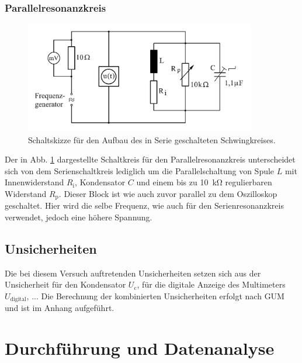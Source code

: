 
		\subsubsection{Parallelresonanzkreis}
			
			\begin{figure}[ht]
				\centering
				\includegraphics[width=0.9\textwidth]{auswertung/Parallelresonanz.PNG}
				\caption{Schaltskizze für den Aufbau des in Serie geschalteten Schwingkreises.}
				\label{fig:ParallelResonanzSkizze}	
			\end{figure}
			
			Der in Abb. \ref{fig:ParallelResonanzSkizze} dargestellte Schaltkreis für den Parallelresonanzkreis unterscheidet sich von dem Serienschaltkreis lediglich um die Parallelschaltung von Spule $L$ mit Innenwiderstand $R_\text{i}$, Kondensator $C$ und einem bis zu \SI{10}{\kilo\ohm} regulierbaren Widerstand $R_\text{p}$. 
			Dieser Block ist wie auch zuvor parallel zu dem Oszilloskop geschaltet.
			Hier wird die selbe Frequenz, wie auch für den Serienresonanzkreis verwendet, jedoch eine höhere Spannung.

	\subsection{Unsicherheiten} 

		Die bei diesem Versuch auftretenden Unsicherheiten setzen sich aus der Unsicherheit für den Kondensator $U_\text{c}$, für die digitale Anzeige des Multimeters $U_\text{digital}$, ... %
		Die Berechnung der kombinierten Unsicherheiten erfolgt nach GUM und ist im Anhang aufgeführt.

\section{Durchführung und Datenanalyse}

